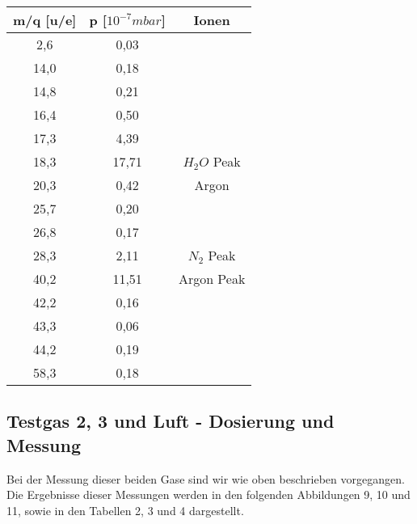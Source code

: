 
\begin{center}
\begin{tabular}{c|c|c}
m/q [u/e] & p [$10^{-7} mbar$] & Ionen\\	
\hline	
2,6 & 0,03	&\\	
14,0 & 0,18	&\\	
14,8 & 0,21	&\\	
16,4 & 0,50	&\\	
17,3 & 4,39	&\\	
18,3 & 17,71 & $H_2O$ Peak\\
20,3 & 0,42	& Argon\\
25,7 & 0,20	&\\
26,8 & 0,17	&\\
28,3 & 2,11	& $N_2$ Peak\\
40,2 & 11,51 & Argon Peak\\
42,2 & 0,16	&\\
43,3 & 0,06	&\\
44,2 & 0,19	&\\
58,3 & 0,18	&\\
\end{tabular}
\end{center}

\subsection{Testgas 2, 3 und Luft - Dosierung und Messung}
Bei der Messung dieser beiden Gase sind wir wie oben beschrieben vorgegangen. Die Ergebnisse dieser Messungen werden in den folgenden Abbildungen 9, 10 und 11, sowie in den Tabellen 2, 3 und 4 dargestellt.


